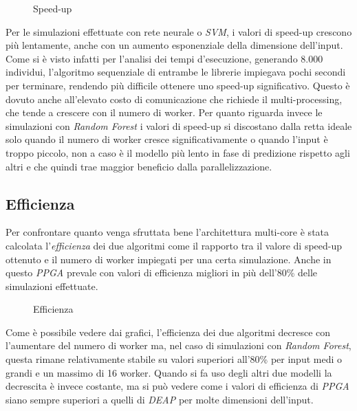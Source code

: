 \begin{figure}[H]
	\centering
	
	\caption{Speed-up}
	\label{fig: speedup_pop}
\end{figure}

Per le simulazioni effettuate con rete neurale o \textit{SVM}, i valori di
speed-up crescono più lentamente, anche con un aumento esponenziale della
dimensione dell'input. Come si è visto infatti per l'analisi dei tempi
d'esecuzione, generando $8.000$ individui, l'algoritmo sequenziale di entrambe
le librerie impiegava pochi secondi per terminare, rendendo più difficile
ottenere uno speed-up significativo. Questo è dovuto anche all'elevato costo di
comunicazione che richiede il multi-processing, che tende a crescere con il
numero di worker. Per quanto riguarda invece le simulazioni con
\textit{Random Forest} i valori di speed-up si discostano dalla retta ideale
solo quando il numero di worker cresce significativamente o quando l'input è
troppo piccolo, non a caso è il modello più lento in fase di predizione rispetto
agli altri e che quindi trae maggior beneficio dalla parallelizzazione.


\subsection{Efficienza}

Per confrontare quanto venga sfruttata bene l'architettura multi-core è stata
calcolata l'\textit{efficienza} dei due algoritmi come il rapporto tra il valore
di speed-up ottenuto e il numero di worker impiegati per una certa simulazione.
Anche in questo \textit{PPGA} prevale con valori di efficienza migliori in più
dell'80\% delle simulazioni effettuate.

\begin{figure}[H]
	\centering
	
	\caption{Efficienza}
	\label{fig: efficiency}
\end{figure}

Come è possibile vedere dai grafici, l'efficienza dei due algoritmi decresce
con l'aumentare del numero di worker ma, nel caso di simulazioni con
\textit{Random Forest}, questa rimane relativamente stabile su valori superiori
all'80\% per input medi o grandi e un massimo di 16 worker. Quando si fa uso
degli altri due modelli la decrescita è invece costante, ma si può vedere come
i valori di efficienza di \textit{PPGA} siano sempre superiori a quelli di
\textit{DEAP} per molte dimensioni dell'input.

